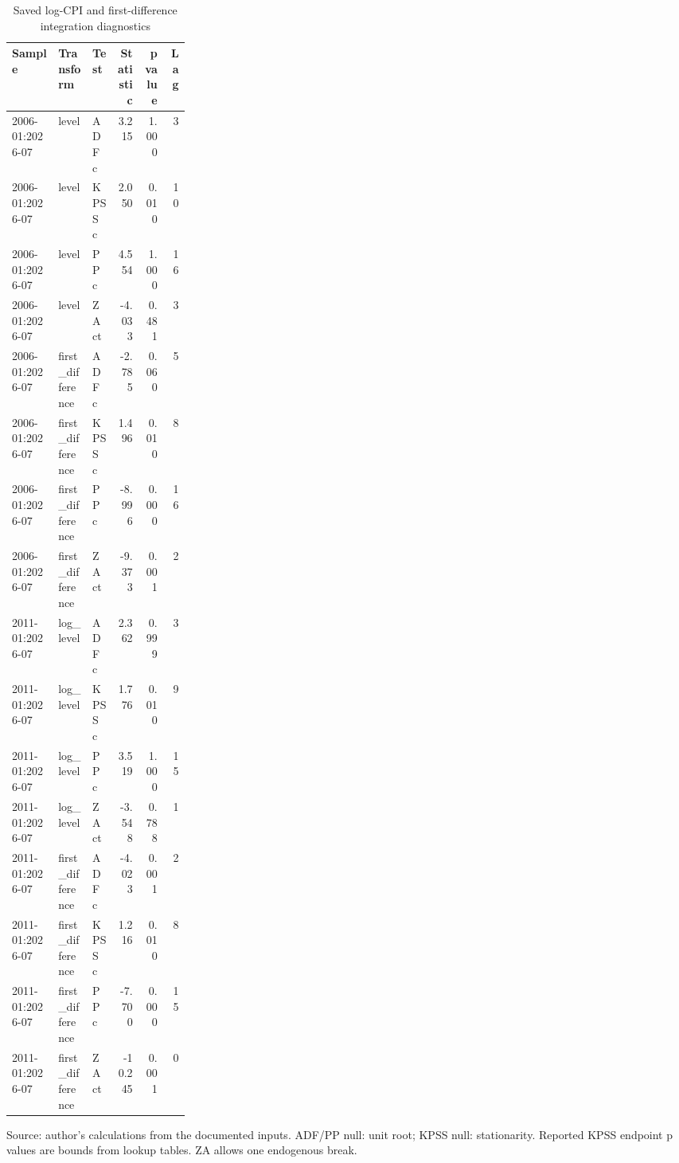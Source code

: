 \begin{table}[htbp]
\centering
\footnotesize
\caption{Saved log-CPI and first-difference integration diagnostics}
\begin{tabularx}{\linewidth}{p{0.26\linewidth}lXrrr}
\toprule
Sample & Transform & Test & Statistic & p value & Lag \\
\midrule
2006-01:2026-07 & level & ADF c & 3.215 & 1.000 & 3 \\
2006-01:2026-07 & level & KPSS c & 2.050 & 0.010 & 10 \\
2006-01:2026-07 & level & PP c & 4.554 & 1.000 & 16 \\
2006-01:2026-07 & level & ZA ct & -4.033 & 0.481 & 3 \\
2006-01:2026-07 & first\_\allowbreak{}difference & ADF c & -2.785 & 0.060 & 5 \\
2006-01:2026-07 & first\_\allowbreak{}difference & KPSS c & 1.496 & 0.010 & 8 \\
2006-01:2026-07 & first\_\allowbreak{}difference & PP c & -8.996 & 0.000 & 16 \\
2006-01:2026-07 & first\_\allowbreak{}difference & ZA ct & -9.373 & 0.001 & 2 \\
2011-01:2026-07 & log\_\allowbreak{}level & ADF c & 2.362 & 0.999 & 3 \\
2011-01:2026-07 & log\_\allowbreak{}level & KPSS c & 1.776 & 0.010 & 9 \\
2011-01:2026-07 & log\_\allowbreak{}level & PP c & 3.519 & 1.000 & 15 \\
2011-01:2026-07 & log\_\allowbreak{}level & ZA ct & -3.548 & 0.788 & 1 \\
2011-01:2026-07 & first\_\allowbreak{}difference & ADF c & -4.023 & 0.001 & 2 \\
2011-01:2026-07 & first\_\allowbreak{}difference & KPSS c & 1.216 & 0.010 & 8 \\
2011-01:2026-07 & first\_\allowbreak{}difference & PP c & -7.700 & 0.000 & 15 \\
2011-01:2026-07 & first\_\allowbreak{}difference & ZA ct & -10.245 & 0.001 & 0 \\
\bottomrule
\end{tabularx}
\par\vspace{3pt}\begin{minipage}{\linewidth}\footnotesize Source: author's calculations from the documented inputs.\allowbreak{} ADF/PP null: unit root; KPSS null: stationarity.\allowbreak{} Reported KPSS endpoint p values are bounds from lookup tables.\allowbreak{} ZA allows one endogenous break.\allowbreak{}\end{minipage}
\end{table}
